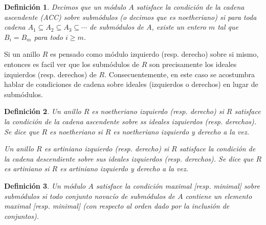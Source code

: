 \documentclass{report}
\newtheorem{definition}{Definición}
\begin{document}
  \begin{definition}
    Decimos que un módulo \(A\) satisface la \emph{condición de la cadena ascendente (ACC) sobre submódulos} (o decimos que es \emph{noetheriano}) si para toda cadena \(A_1 \subseteq A_2 \subseteq A_3 \subseteq \cdots\) de submódulos de \(A\), existe un entero \(m\) tal que \(B_i = B_m\) para todo \(i \geq m\).
  \end{definition}

  Si un anillo \(R\) es pensado como módulo izquierdo (resp. derecho) sobre si mismo, entonces es facil ver que los submódulos de \(R\) son precisamente los ideales izquierdos (resp. derechos) de \(R\).
  Consecuentemente, en este caso se acostumbra hablar de condiciones de cadena sobre ideales (izquierdos o derechos) en lugar de submódulos.

  \begin{definition}
    Un anillo \(R\) es \emph{noetheriano izquierdo} (resp. \emph{derecho}) si \(R\) satisface la condición de la cadena ascendente sobre ss ideales izquierdos (resp. derechos).
    Se dice que \(R\) es \emph{noetheriano} si \(R\) es noetheriano izquierdo y derecho a la vez.

    Un anillo \(R\) es \emph{artiniano izquierdo} (resp. \emph{derecho}) si \(R\) satisface la condición de la cadena descendiente sobre sus ideales izquierdos (resp. derechos).
    Se dice que \(R\) es artiniano si \(R\) es artiniano izquierdo y derecho a la vez.
  \end{definition}

  \begin{definition}
    Un módulo \(A\) satisface la \emph{condición maximal} [resp. \emph{minimal}] \emph{sobre submódulos} si todo conjunto novacío de submódulos de \(A\) contiene un elemento maximal [resp. minimal] (con respecto al orden dado por la inclusión de conjuntos).
  \end{definition}
\end{document}
